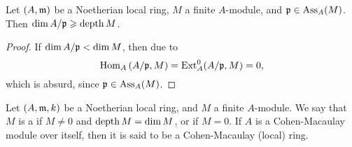 \begin{corollary}
    Let $(A,\mathfrak{m})$ be a Noetherian local ring, $M$ a finite $A$-module, and $\mathfrak{p}\in\operatorname{Ass}_A(M)$. Then $\dim A/\mathfrak{p}\geqslant\operatorname{depth} M$.
\end{corollary}
\begin{proof}
    If $\dim A/\mathfrak{p} < \dim M$, then due to  
    \begin{equation*}
        \operatorname{Hom}_A\left(A/\mathfrak{p}, M\right) = \operatorname{Ext}^0_A(A/\mathfrak{p}, M) = 0,
    \end{equation*}
    which is absurd, since $\mathfrak{p}\in\operatorname{Ass}_A(M)$.
\end{proof}

\begin{definition}
    Let $(A,\mathfrak{m}, k)$ be a Noetherian local ring, and $M$ a finite $A$-module. We say that $M$ is a  if $M\ne 0$ and $\operatorname{depth} M = \dim M$, or if $M = 0$. If $A$ is a Cohen-Macaulay module over itself, then it is said to be a Cohen-Macaulay (local) ring.
\end{definition}

